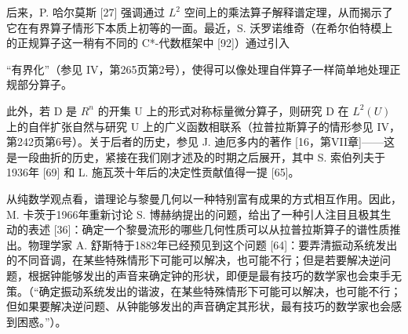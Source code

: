 后来，P. 哈尔莫斯 {[}27{]} 强调通过 \(L^{2}\) 空间上的乘法算子解释谱定理，从而揭示了它在有界算子情形下本质上初等的一面。最近，S. 沃罗诺维奇（在希尔伯特模上的正规算子这一稍有不同的 C*-代数框架中 {[}92{]}）通过引入

“有界化”（参见 IV，第265页第2号），使得可以像处理自伴算子一样简单地处理正规部分算子。

此外，若 D 是 \(R^{n}\) 的开集 U 上的形式对称标量微分算子，则研究 D 在 \(L^{2}(U)\) 上的自伴扩张自然与研究 U 上的广义函数相联系（拉普拉斯算子的情形参见 IV，第242页第6号）。关于后者的历史，参见 J. 迪厄多内的著作 {[}16，第VII章{]}——这是一段曲折的历史，紧接在我们刚才述及的时期之后展开，其中 S. 索伯列夫于1936年 {[}69{]} 和 L. 施瓦茨十年后的决定性贡献值得一提 {[}65{]}。

从纯数学观点看，谱理论与黎曼几何以一种特别富有成果的方式相互作用。因此，M. 卡茨于1966年重新讨论 S. 博赫纳提出的问题，给出了一种引人注目且极其生动的表述 {[}36{]}：确定一个黎曼流形的哪些几何性质可以从拉普拉斯算子的谱性质推出。物理学家 A. 舒斯特于1882年已经预见到这个问题 {[}64{]}：要弄清振动系统发出的不同音调，在某些特殊情形下可能可以解决，也可能不行；但是若要解决逆问题，根据钟能够发出的声音来确定钟的形状，即便是最有技巧的数学家也会束手无策。（“确定振动系统发出的谐波，在某些特殊情形下可能可以解决，也可能不行；但如果要解决逆问题、从钟能够发出的声音确定其形状，最有技巧的数学家也会感到困惑。”）。

